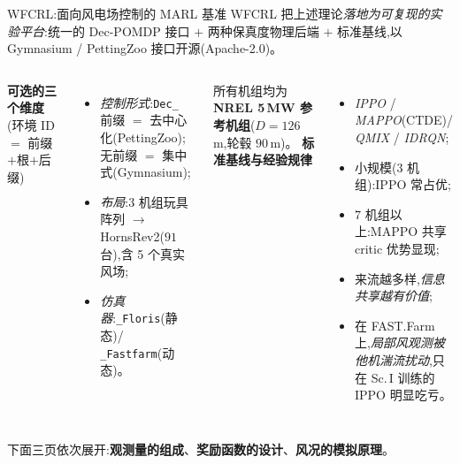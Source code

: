 \documentclass[aspectratio=169,11pt,UTF8]{ctexbeamer}
\begin{document}
\begin{frame}{WFCRL:面向风电场控制的 MARL 基准}
\small
WFCRL 把上述理论\emph{落地为可复现的实验平台}:统一的 Dec-POMDP 接口 $+$ 两种保真度物理后端 $+$ 标准基线,以 Gymnasium / PettingZoo 接口开源(Apache-2.0)。
\begin{columns}[T]
\textbf{可选的三个维度}(环境 ID $=$ 前缀$+$根$+$后缀)
\begin{itemize}\setlength\itemsep{1pt}
  \item \emph{控制形式}:\texttt{Dec\_} 前缀 $=$ 去中心化(PettingZoo);无前缀 $=$ 集中式(Gymnasium);
  \item \emph{布局}:$3$ 机组玩具阵列 $\to$ HornsRev2($91$ 台),含 5 个真实风场;
  \item \emph{仿真器}:\texttt{\_Floris}(静态)/ \texttt{\_Fastfarm}(动态)。
\end{itemize}
\vspace{1mm}
所有机组均为 \textbf{NREL 5\,MW 参考机组}($D=126$\,m,轮毂 $90$\,m)。
\textbf{标准基线与经验规律}
\begin{itemize}\setlength\itemsep{1pt}
  \item \emph{IPPO} / \emph{MAPPO}(CTDE)/ \emph{QMIX} / \emph{IDRQN};
  \item 小规模($3$ 机组):IPPO 常占优;
  \item $7$ 机组以上:MAPPO 共享 critic 优势显现;
  \item 来流越多样,\emph{信息共享越有价值};
  \item 在 FAST.Farm 上,\emph{局部风观测被他机湍流扰动},只在 Sc.\,I 训练的 IPPO 明显吃亏。
\end{itemize}
\end{columns}
\vspace{1mm}
\centering\footnotesize\color{mygray}
下面三页依次展开:\textbf{观测量的组成}、\textbf{奖励函数的设计}、\textbf{风况的模拟原理}。
\end{frame}
\end{document}
